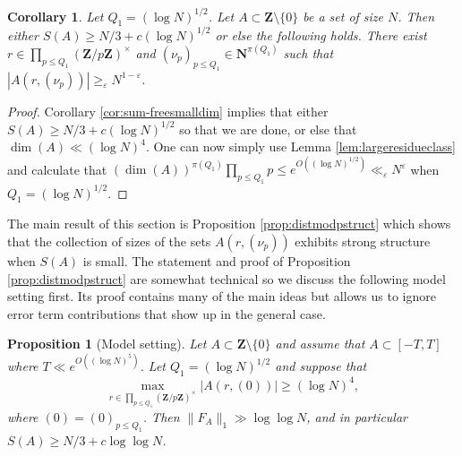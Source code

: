 \documentclass[11pt, reqno]{amsart}
\newtheorem{proposition}[theorem]{Proposition}
\newtheorem{cor}[theorem]{Corollary}
\begin{document}
\begin{cor}\label{cor:largeA(s,mu)}
    Let $Q_1=(\log N)^{1/2}$. Let $A\subset\mathbf{Z}\setminus\{0\}$ be a set of size $N$. Then either $S(A)\geqslant N/3+c(\log N)^{1/2}$ or else the following holds. There exist $r\in \prod_{p\leqslant Q_1}\left(\mathbf{Z}/p\mathbf{Z}\right)^\times$ and $(\nu_p)_{p\leqslant Q_1}\in\mathbf{N}^{\pi(Q_1)}$ such that $|A(r,(\nu_p))|\geqslant_\varepsilon N^{1-\varepsilon}$.
\end{cor}
\begin{proof}
    Corollary \ref{cor:sum-freesmalldim} implies that either $S(A)\geqslant N/3+c(\log N)^{1/2}$ so that we are done, or else that $\dim(A)\ll (\log N)^4$. One can now simply use Lemma \ref{lem:largeresidueclass} and calculate that $(\dim(A))^{\pi(Q_1)}\prod_{p\leqslant Q_1}p\leqslant e^{O((\log N)^{1/2})}\ll_\varepsilon N^\varepsilon$ when $Q_1=(\log N)^{1/2}$.
\end{proof}
The main result of this section is Proposition \ref{prop:distmodpstruct} which shows that the collection of sizes of the sets $A(r,(\nu_p))$ exhibits strong structure when $S(A)$ is small. The statement and proof of Proposition \ref{prop:distmodpstruct} are somewhat technical so we discuss the following model setting first. Its proof contains many of the main ideas but allows us to ignore error term contributions that show up in the general case.
\begin{proposition}[Model setting]\label{prop:distmodel1}
    Let $A\subset\mathbf{Z}\setminus\{0\}$ and assume that $A\subset [-T,T]$ where $T\ll e^{O((\log N)^5)}$. Let $Q_1=(\log N)^{1/2}$ and suppose that $$\max_{r\in\prod_{p\leqslant Q_1}(\mathbf{Z}/p\mathbf{Z})^\times}|A(r,(0))|\geqslant (\log N)^4,$$ where $(0)=(0)_{p\leqslant Q_1}$. Then $\lVert F_A\rVert_1\gg \log\log N$, and in particular $S(A)\geqslant N/3+c\log\log N$.
\end{proposition}
\end{document}
